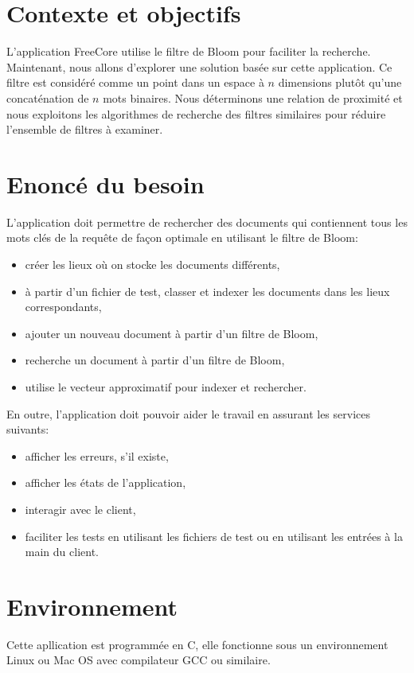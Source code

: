 \documentclass[a4paper,12pt]{report}
\begin{document}
	\section{Contexte et objectifs}
		L'application FreeCore utilise le filtre de Bloom pour faciliter la recherche. Maintenant, nous allons d'explorer une solution basée sur cette application. Ce filtre est considéré comme un point dans un espace à $n$ dimensions plutôt qu'une concaténation de $n$ mots binaires. Nous déterminons une relation de proximité et nous exploitons les algorithmes de recherche des filtres similaires pour réduire l'ensemble de filtres à examiner.
		
	\section{Enoncé du besoin}
		L'application doit permettre de rechercher des documents qui contiennent tous les mots clés de la requête de façon optimale en utilisant le filtre de Bloom:
	\begin{itemize}
	
	\item créer les lieux où on stocke les documents différents,
	\item à partir d'un fichier de test, classer et indexer les documents dans les lieux correspondants,		
	\item ajouter un nouveau document à partir d'un filtre de Bloom,	
	\item recherche un document à partir d'un filtre de Bloom,	
	\item utilise le vecteur approximatif pour indexer et rechercher.				\end{itemize}
	
En outre, l'application doit pouvoir aider le travail en assurant les services suivants:

	\begin{itemize}
	\item afficher les erreurs, s'il existe,	
	\item afficher les états de l'application,	
	\item interagir avec le client,
	\item faciliter les tests en utilisant les fichiers de test ou en utilisant les entrées à la main du client.
	\end{itemize}
	
	\section{Environnement}
		Cette apllication est programmée en C, elle fonctionne sous un environnement Linux ou Mac OS avec compilateur GCC ou similaire.
\end{document}

